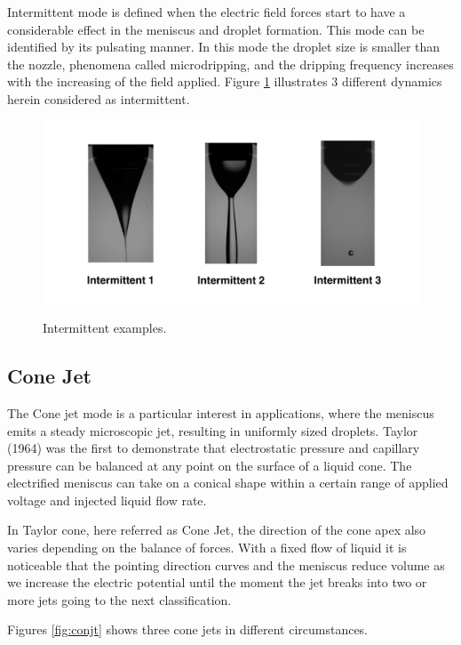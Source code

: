 Intermittent mode is defined when the electric field forces start to have a considerable effect in the meniscus and droplet formation. 
This mode can be identified by its pulsating manner.
In this mode the droplet size is smaller than the nozzle, phenomena called microdripping, and the dripping frequency increases with the increasing of the field applied.
Figure \ref{fig:intermittent_example} illustrates 3 different dynamics herein considered as intermittent.


  \begin{figure}[H]
      \center
      \includegraphics[width=15cm]{Figuras/19:03/intermittent_example.png}
      \label{fig:intermittent_example}
      \caption{Intermittent examples.}
  \end{figure}


\subsection{Cone Jet}
\label{subsec:Cone Jet}

The Cone jet mode is a particular interest in applications, where the meniscus emits a steady microscopic jet, resulting in uniformly sized droplets. 
Taylor (1964)\cite{taylor} was the first to demonstrate that electrostatic pressure and capillary pressure can be balanced at any point on the surface of a liquid cone.
The electrified meniscus can take on a conical shape within a certain range of applied voltage and injected liquid flow rate. 

In Taylor cone, here referred as Cone Jet, the direction of the cone apex also varies depending on the balance of forces. 
With a fixed flow of liquid it is noticeable that the pointing direction curves and the meniscus reduce volume as we increase the electric potential until the moment the jet breaks into two or more jets going to the next classification. 

Figures \ref{fig:conjt} shows three cone jets in different circumstances.

